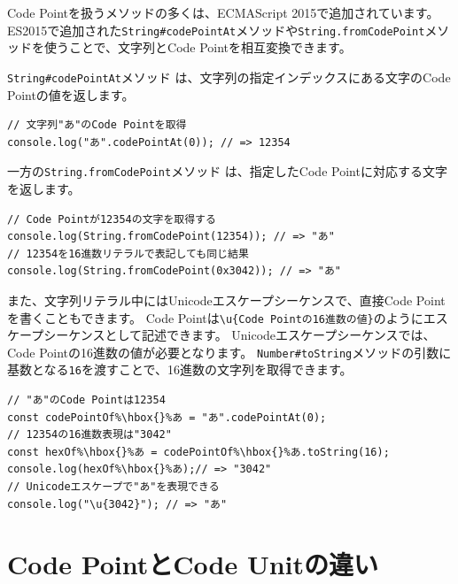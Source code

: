 Code Pointを扱うメソッドの多くは、ECMAScript 2015で追加されています。
ES2015で追加された\texttt{String\#codePointAt}メソッドや\texttt{String.fromCodePoint}メソッドを使うことで、文字列とCode
Pointを相互変換できます。

\texttt{String\#codePointAt}メソッド\,\protect{}\,は、文字列の指定インデックスにある文字のCode
Pointの値を返します。

\begin{lstlisting}
// 文字列"あ"のCode Pointを取得
console.log("あ".codePointAt(0)); // => 12354
\end{lstlisting}

一方の\texttt{String.fromCodePoint}メソッド\,\protect{}\,は、指定したCode
Pointに対応する文字を返します。

\begin{lstlisting}
// Code Pointが12354の文字を取得する
console.log(String.fromCodePoint(12354)); // => "あ"
// 12354を16進数リテラルで表記しても同じ結果
console.log(String.fromCodePoint(0x3042)); // => "あ"
\end{lstlisting}

また、文字列リテラル中にはUnicodeエスケープシーケンスで、直接Code
Pointを書くこともできます。 Code
Pointは\texttt{\textbackslash u\{Code Pointの16進数の値\}}のようにエスケープシーケンスとして記述できます。
Unicodeエスケープシーケンスでは、Code
Pointの16進数の値が必要となります。
\texttt{Number\#toString}メソッドの引数に基数となる\texttt{16}を渡すことで、16進数の文字列を取得できます。

\begin{lstlisting}[escapechar=\%]
// "あ"のCode Pointは12354
const codePointOf%\hbox{}%あ = "あ".codePointAt(0);
// 12354の16進数表現は"3042"
const hexOf%\hbox{}%あ = codePointOf%\hbox{}%あ.toString(16);
console.log(hexOf%\hbox{}%あ);// => "3042"
// Unicodeエスケープで"あ"を表現できる
console.log("\u{3042}"); // => "あ"
\end{lstlisting}

\hypertarget{code-point-is-not-code-unit}{%
\section{Code PointとCode
Unitの違い}\label{code-point-is-not-code-unit}}

